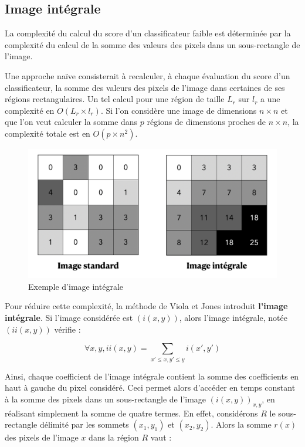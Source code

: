\documentclass[12pt,a4paper]{article}
\begin{document}
\subsection{Image intégrale}
La complexité du calcul du score d'un classificateur faible est déterminée par la complexité du calcul de la somme des valeurs des pixels dans un sous-rectangle de l'image.

Une approche naïve consisterait à recalculer, à chaque évaluation du score d'un classificateur, la somme des valeurs des pixels de l'image dans certaines de ses régions rectangulaires. Un tel calcul pour une région de taille $L_r$ sur $l_r$ a une complexité en $O(L_r \times l_r)$. Si l'on considère une image de dimensions $n \times n$ et que l'on veut calculer la somme dans $p$ régions de dimensions proches de $n \times n$, la complexité totale est en $O(p \times n^2)$.

\begin{figure}
        \includegraphics[scale = 0.35]{image-integrale2}
        \centering
        \caption{Exemple d'image intégrale}
    \end{figure}

Pour réduire cette complexité, la méthode de Viola et Jones introduit \textbf{l'image intégrale}. Si l'image considérée est $(i(x, y))$, alors l'image intégrale, notée $(ii(x, y))$ vérifie :

\begin{equation}
    \forall x, y, ii(x, y) = \sum_{x' \leq x, y' \leq y} i(x', y')
\end{equation}

Ainsi, chaque coefficient de l'image intégrale contient la somme des coefficients en haut à gauche du pixel considéré. Ceci permet alors d'accéder en temps constant à la somme des pixels dans un sous-rectangle de l'image $(i(x, y))_{x, y}$, en réalisant simplement la somme de quatre termes. En effet, considérons $R$ le sous-rectangle délimité par les sommets $(x_1, y_1)$ et $(x_2, y_2)$. Alors la somme $r(x)$ des pixels de l'image $x$ dans la région $R$ vaut :
\end{document}
